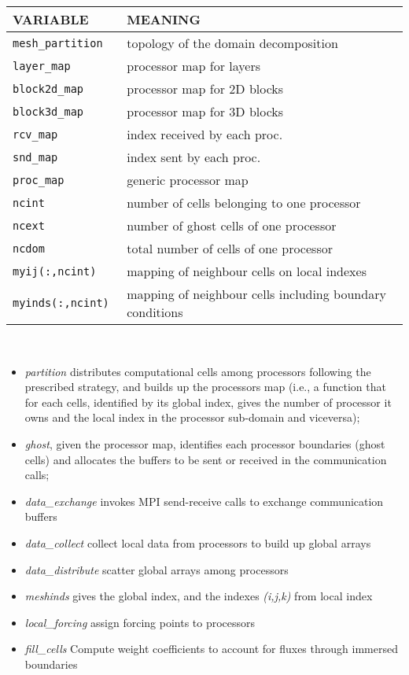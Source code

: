 \begin{tabular}{|p{6cm}|p{6cm}|}\hline
VARIABLE & MEANING\\\hline
\tt mesh\_partition   & topology of the domain decomposition\\ \hline
\tt layer\_map   & processor map for layers\\ \hline
\tt block2d\_map & processor map for 2D blocks\\ \hline
\tt block3d\_map & processor map for 3D blocks\\ \hline
\tt rcv\_map   & index received by each proc.\\ \hline
\tt snd\_map & index sent by each proc.\\ \hline
\tt proc\_map & generic processor map\\ \hline
\tt ncint    & number of cells belonging to one processor\\ \hline
\tt ncext    & number of ghost cells of one processor\\ \hline
\tt ncdom    & total number of cells of one processor\\ \hline
\tt myij(:,ncint)   &  mapping of neighbour cells on local indexes\\ \hline
\tt myinds(:,ncint) &  mapping of neighbour cells including boundary conditions\\ \hline
\end{tabular}\\[5mm]
\begin{itemize}
\item{\em partition} distributes computational cells among processors following the 
prescribed strategy, and builds up the processors map (i.e., a function that
 for each cells, identified by its global index, gives the number of 
processor it owns and the local index in the processor sub-domain and viceversa);
\item{\em ghost}, given the processor map, identifies each processor boundaries 
(ghost cells) and
allocates the buffers to be sent or received in the communication calls;
\item{\em data\_exchange} invokes MPI send-receive calls to exchange communication 
 buffers
\item{\em data\_collect} collect local data from processors to build up global arrays
\item{\em data\_distribute} scatter global arrays among processors
\item{\em meshinds} gives the global index, and the indexes {\em (i,j,k)} from local index
\item{\em local\_forcing} assign forcing points to processors
\item{\em fill\_cells} Compute weight coefficients to account for fluxes through immersed boundaries
\end{itemize}
